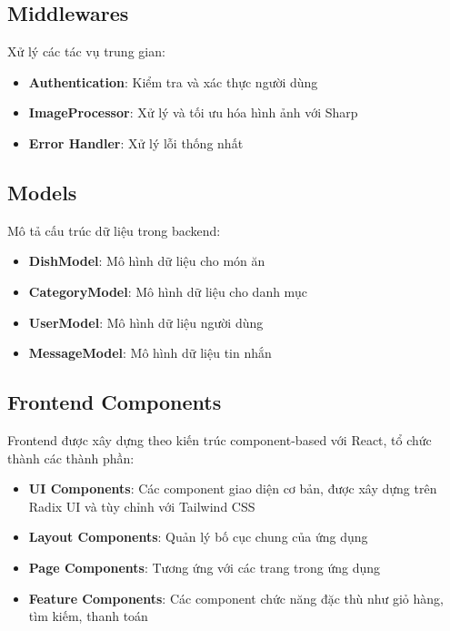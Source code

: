 \subsection{Middlewares}
Xử lý các tác vụ trung gian:
\begin{itemize}
    \item \textbf{Authentication}: Kiểm tra và xác thực người dùng
    \item \textbf{ImageProcessor}: Xử lý và tối ưu hóa hình ảnh với Sharp
    \item \textbf{Error Handler}: Xử lý lỗi thống nhất
\end{itemize}

\subsection{Models}
Mô tả cấu trúc dữ liệu trong backend:
\begin{itemize}
    \item \textbf{DishModel}: Mô hình dữ liệu cho món ăn
    \item \textbf{CategoryModel}: Mô hình dữ liệu cho danh mục
    \item \textbf{UserModel}: Mô hình dữ liệu người dùng
    \item \textbf{MessageModel}: Mô hình dữ liệu tin nhắn
\end{itemize}

\subsection{Frontend Components}
Frontend được xây dựng theo kiến trúc component-based với React, tổ chức thành các thành phần:
\begin{itemize}
    \item \textbf{UI Components}: Các component giao diện cơ bản, được xây dựng trên Radix UI và tùy chỉnh với Tailwind CSS
    \item \textbf{Layout Components}: Quản lý bố cục chung của ứng dụng
    \item \textbf{Page Components}: Tương ứng với các trang trong ứng dụng
    \item \textbf{Feature Components}: Các component chức năng đặc thù như giỏ hàng, tìm kiếm, thanh toán
\end{itemize}

